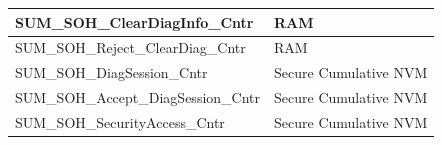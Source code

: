 \begin{longtable}{|l|l|}
\begin{minipage}{0.47\linewidth}\raggedright\vspace{.75ex}SUM\_SOH\_ClearDiagInfo\_Cntr\vspace{.75ex}\end{minipage} & \begin{minipage}{0.47\linewidth}\raggedright\vspace{.75ex}RAM\vspace{.75ex}\end{minipage}\\\hline
\begin{minipage}{0.47\linewidth}\raggedright\vspace{.75ex}SUM\_SOH\_Reject\_ClearDiag\_Cntr\vspace{.75ex}\end{minipage} & \begin{minipage}{0.47\linewidth}\raggedright\vspace{.75ex}RAM\vspace{.75ex}\end{minipage}\\\hline
\begin{minipage}{0.47\linewidth}\raggedright\vspace{.75ex}SUM\_SOH\_DiagSession\_Cntr\vspace{.75ex}\end{minipage} & \begin{minipage}{0.47\linewidth}\raggedright\vspace{.75ex}Secure Cumulative NVM\vspace{.75ex}\end{minipage}\\\hline
\begin{minipage}{0.47\linewidth}\raggedright\vspace{.75ex}SUM\_SOH\_Accept\_DiagSession\_Cntr\vspace{.75ex}\end{minipage} & \begin{minipage}{0.47\linewidth}\raggedright\vspace{.75ex}Secure Cumulative NVM\vspace{.75ex}\end{minipage}\\\hline
\begin{minipage}{0.47\linewidth}\raggedright\vspace{.75ex}SUM\_SOH\_SecurityAccess\_Cntr\vspace{.75ex}\end{minipage} & \begin{minipage}{0.47\linewidth}\raggedright\vspace{.75ex}Secure Cumulative NVM\vspace{.75ex}\end{minipage}\\\hline

\end{longtable}
